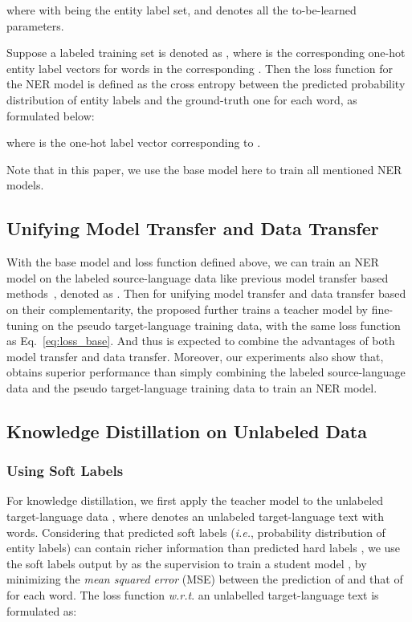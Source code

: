 \documentclass{article}
\newcommand\ie{\textit{i.e.}}
\newcommand\wrt{\textit{w.r.t}}
\newcommand\unitrans{\text{UniTrans}}
\begin{document}
where  with  being the entity label set, and  denotes all the to-be-learned parameters.

Suppose a labeled training set is denoted as , where  is the corresponding one-hot entity label vectors for words in the corresponding . Then the loss function  for the NER model is defined as the cross entropy between the predicted probability distribution of entity labels and the ground-truth one for each word, as formulated below:

where  is the one-hot label vector corresponding to .

Note that in this paper, we use the base model here to train all mentioned NER models.

\subsection{Unifying Model Transfer and Data Transfer}
\label{sec:unify}
With the base model and loss function defined above, we can train an NER model on the labeled source-language data like previous model transfer based methods~\cite{wu2019beto}, denoted as . Then for unifying model transfer and data transfer based on their complementarity, the proposed \unitrans{} further trains a teacher model  by fine-tuning  on the pseudo target-language training data, with the same loss function as Eq.~\ref{eq:loss_base}. And thus  is expected to combine the advantages of both model transfer and data transfer. Moreover, our experiments also show that,  obtains superior performance than simply combining the labeled source-language data and the pseudo target-language training data to train an NER model.


\subsection{Knowledge Distillation on Unlabeled Data}
\label{sec:knowledge}


\subsubsection{Using Soft Labels}
For knowledge distillation, we first apply the teacher model  to the unlabeled target-language data , where  denotes an unlabeled target-language text with  words. Considering that predicted soft labels (\ie{}, probability distribution of entity labels) can contain richer information than predicted hard labels \cite{hinton2015distilling}, we use the soft labels output by  as the supervision to train a student model , by minimizing the \emph{mean squared error} (MSE) between the prediction of  and that of  for each word. 
The loss function \wrt. an unlabelled target-language text  is formulated as:
\end{document}
